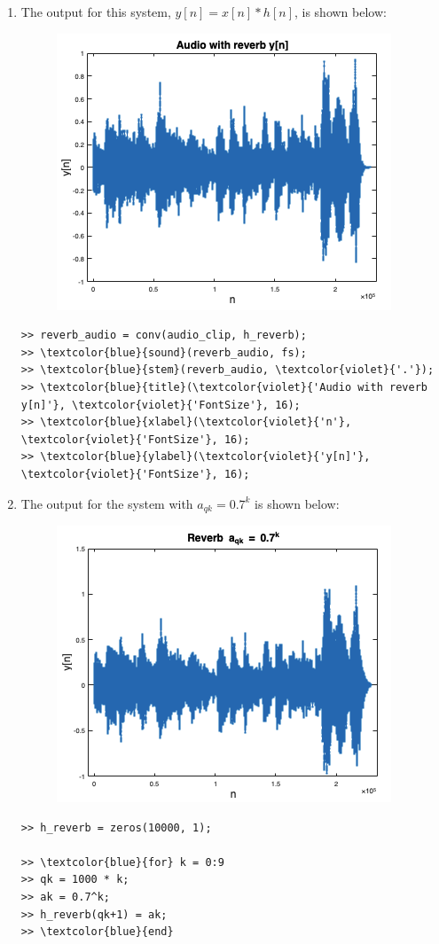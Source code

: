 \documentclass[12pt]{article}
\begin{document}
\begin{enumerate}[label=\textbf{\alph*)}, leftmargin=2.6em]
\item The output for this system, $y[n]=x[n]\ast h[n]$, is shown below:
\begin{figure}[H]
    \centering
    \includegraphics[width=0.5\linewidth]{plot3.png}
\end{figure}
\begin{Verbatim}[frame=single, commandchars=\\\{\}]
>> reverb_audio = conv(audio_clip, h_reverb);
>> \textcolor{blue}{sound}(reverb_audio, fs);
>> \textcolor{blue}{stem}(reverb_audio, \textcolor{violet}{'.'});
>> \textcolor{blue}{title}(\textcolor{violet}{'Audio with reverb y[n]'}, \textcolor{violet}{'FontSize'}, 16);
>> \textcolor{blue}{xlabel}(\textcolor{violet}{'n'}, \textcolor{violet}{'FontSize'}, 16);
>> \textcolor{blue}{ylabel}(\textcolor{violet}{'y[n]'}, \textcolor{violet}{'FontSize'}, 16);
\end{Verbatim}

\item The output for the system with $a_{qk}=0.7^k$ is shown below:
\begin{figure}[H]
    \centering
    \includegraphics[width=0.5\linewidth]{plot4.png}
\end{figure}
\begin{Verbatim}[frame=single, commandchars=\\\{\}]
>> h_reverb = zeros(10000, 1);

>> \textcolor{blue}{for} k = 0:9
>> qk = 1000 * k;
>> ak = 0.7^k;
>> h_reverb(qk+1) = ak;
>> \textcolor{blue}{end}


\end{Verbatim}
\end{enumerate}
\end{document}

